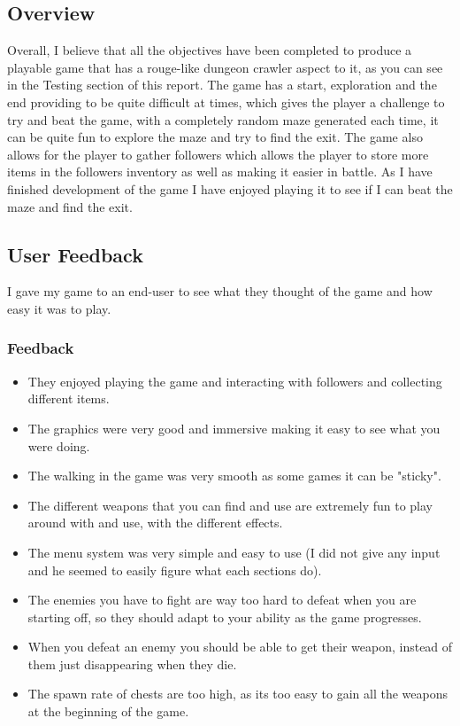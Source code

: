 \documentclass[../Main.tex]{subfiles}
\begin{document}
    \subsection{Overview}
        Overall, I believe that all the objectives have been completed to produce a playable game that has a rouge-like dungeon crawler aspect to it, as you can see in the Testing section of this report. The game has a start, exploration and the end providing to be quite difficult at times, which gives the player a challenge to try and beat the game, with a completely random maze generated each time, it can be quite fun to explore the maze and try to find the exit. The game also allows for the player to gather followers which allows the player to store more items in the followers inventory as well as making it easier in battle. As I have finished development of the game I have enjoyed playing it to see if I can beat the maze and find the exit.
    \subsection{User Feedback}
        I gave my game to an end-user to see what they thought of the game and how easy it was to play.
        \subsubsection{Feedback}
            \begin{itemize}
                \item They enjoyed playing the game and interacting with followers and collecting different items.
                \item The graphics were very good and immersive making it easy to see what you were doing.
                \item The walking in the game was very smooth as some games it can be "sticky".
                \item The different weapons that you can find and use are extremely fun to play around with and use, with the different effects.
                \item The menu system was very simple and easy to use (I did not give any input and he seemed to easily figure what each sections do).
                \item The enemies you have to fight are way too hard to defeat when you are starting off, so they should adapt to your ability as the game progresses.
                \item When you defeat an enemy you should be able to get their weapon, instead of them just disappearing when they die.
                \item The spawn rate of chests are too high, as its too easy to gain all the weapons at the beginning of the game.
            \end{itemize}
\end{document}
